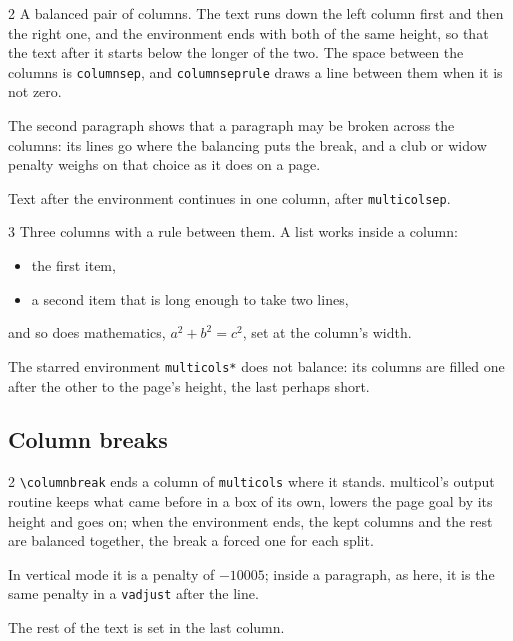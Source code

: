 \documentclass{article}
\numberwithin{equation}{section}
\theoremstyle{definition}
\theoremstyle{remark}
\begin{document}
\begin{multicols}{2}
A balanced pair of columns. The text runs down the left column first and then the right
one, and the environment ends with both of the same height, so that the text after it
starts below the longer of the two. The space between the columns is
\texttt{columnsep}, and \texttt{columnseprule} draws a line between them when it is
not zero.

The second paragraph shows that a paragraph may be broken across the columns: its lines
go where the balancing puts the break, and a club or widow penalty weighs on that choice
as it does on a page.
\end{multicols}

Text after the environment continues in one column, after \texttt{multicolsep}.
\setlength{\columnseprule}{0.4pt}
\begin{multicols}{3}
\small Three columns with a rule between them. A list works inside a column:
\begin{itemize}
  \item the first item,
  \item a second item that is long enough to take two lines,
\end{itemize}
and so does mathematics, $a^2+b^2=c^2$, set at the column's width.
\end{multicols}
\setlength{\columnseprule}{0pt}
The starred environment \texttt{multicols*} does not balance: its columns are filled one
after the other to the page's height, the last perhaps short.

\subsection{Column breaks}\label{sec:columnbreak}
\begin{multicols}{2}
\texttt{\textbackslash columnbreak} ends a column of \texttt{multicols} where it stands.
multicol's output routine keeps what came before in a box of its own, lowers the page goal
by its height and goes on; when the environment ends, the kept columns and the rest are
balanced together, the break a forced one for each split.
\columnbreak

In vertical mode it is a penalty of $-10005$; inside a paragraph,\columnbreak{} as here, it
is the same penalty in a \texttt{vadjust} after the line.

The rest of the text is set in the last column.
\end{multicols}
\end{document}
